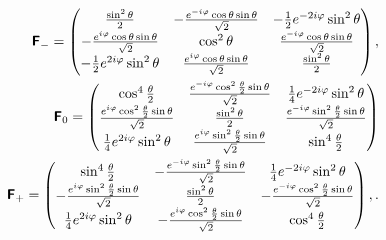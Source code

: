 \begin{equation}
\begin{split}
\textsf{\textbf{F}}_{-}
=
\begin{pmatrix}
\frac{\sin ^2\theta }{2} & -\frac{e^{-i \varphi } \cos \theta  \sin \theta }{\sqrt{2}} & -\frac{1}{2} e^{-2 i \varphi } \sin ^2\theta  \\
 -\frac{e^{i \varphi } \cos \theta  \sin \theta }{\sqrt{2}} & \cos ^2\theta  & \frac{e^{-i \varphi } \cos \theta  \sin \theta }{\sqrt{2}} \\
 -\frac{1}{2} e^{2 i \varphi } \sin ^2\theta  & \frac{e^{i \varphi } \cos \theta  \sin \theta }{\sqrt{2}} & \frac{\sin ^2\theta }{2}
\end{pmatrix}  ,
\\
\textsf{\textbf{F}}_{0}
=
\begin{pmatrix}
\cos ^4\frac{\theta }{2} & \frac{e^{-i \varphi } \cos^2 \frac{\theta}{2} \sin \theta }{ \sqrt{2}} & \frac{1}{4} e^{-2 i \varphi } \sin ^2\theta  \\
 \frac{e^{i \varphi } \cos^2 \frac{\theta}{2} \sin \theta }{ \sqrt{2}} & \frac{\sin ^2\theta }{2} & \frac{e^{-i \varphi } \sin ^2\frac{\theta }{2} \sin \theta }{\sqrt{2}} \\
 \frac{1}{4} e^{2 i \varphi } \sin ^2\theta  & \frac{e^{i \varphi } \sin ^2\frac{\theta }{2} \sin \theta }{\sqrt{2}} & \sin ^4\frac{\theta }{2}
\end{pmatrix}
   \\
\textsf{\textbf{F}}_{+}
=
\begin{pmatrix}
\sin ^4\frac{\theta }{2} & -\frac{e^{-i \varphi } \sin ^2\frac{\theta }{2} \sin \theta }{\sqrt{2}} & \frac{1}{4} e^{-2 i \varphi } \sin ^2\theta  \\
 -\frac{e^{i \varphi } \sin ^2\frac{\theta }{2} \sin \theta }{\sqrt{2}} & \frac{\sin ^2\theta }{2} & -\frac{e^{-i \varphi } \cos^2 \frac{\theta}{2} \sin \theta }{\sqrt{2}} \\
 \frac{1}{4} e^{2 i \varphi } \sin ^2\theta  & -\frac{e^{i \varphi } \cos^2 \frac{\theta}{2} \sin \theta }{ \sqrt{2}} & \cos ^4\frac{\theta }{2}
\end{pmatrix}  ,
.
\end{split}
\label{e-2009-gtq-s2f}
\end{equation}


